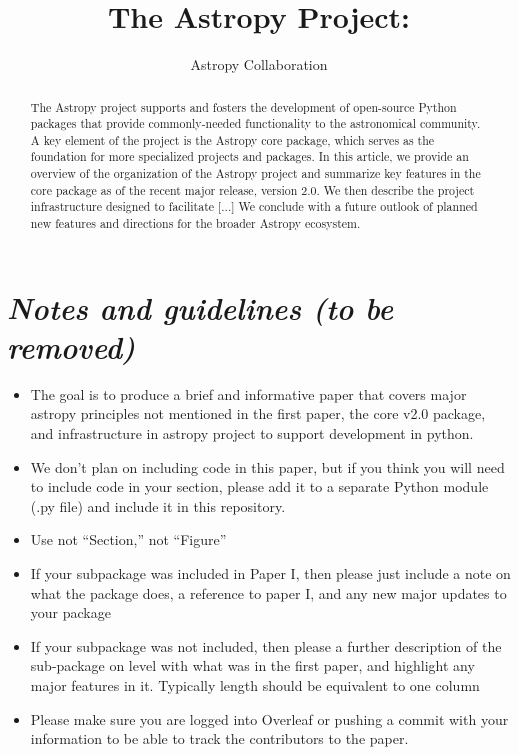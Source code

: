 \documentclass[modern]{aastex61}
\newcommand{\escapecmd}[1]{\texttt{\detokenize{#1}}}
\begin{document}
\draft{\today}

\title{The Astropy Project: }


\author{Astropy Collaboration}

\begin{abstract}
The Astropy project supports and fosters the development of open-source Python
packages that provide commonly-needed functionality to the astronomical
community.
A key element of the project is the Astropy core package, which serves as the
foundation for more specialized projects and packages.
In this article, we provide an overview of the organization of the Astropy
project and summarize key features in the core package as of the recent major
release, version 2.0.
We then describe the project infrastructure designed to facilitate [...]
We conclude with a future outlook of planned new features and directions for the
broader Astropy ecosystem.
\end{abstract}

\keywords{}

\section*{\textit{Notes and guidelines (to be removed)}}

\begin{itemize}
   \item The goal is to produce a brief and informative paper that covers major astropy principles not mentioned in the first paper, the core v2.0 package, and infrastructure in astropy project to support development in python.   
	\item We don't plan on including code in this paper, but if you think you will need to include code in your section, please add it to a separate Python module (.py file) and include it in this repository.
    \item Use \escapecmd{\sectionname} not ``Section,'' \escapecmd{\figurename} not ``Figure''
    \item If your subpackage was included in Paper I, then please just include a note on what the package does, a reference to paper I, and any new major updates to your package
    \item If your subpackage was not included, then please a further description of the sub-package on level with what was in the first paper, and highlight any major features in it.   Typically length should be equivalent to one column
    \item Please make sure you are logged into Overleaf or pushing a commit with your information to be able to track the contributors to the paper. 
    
\end{itemize}
\end{document}
